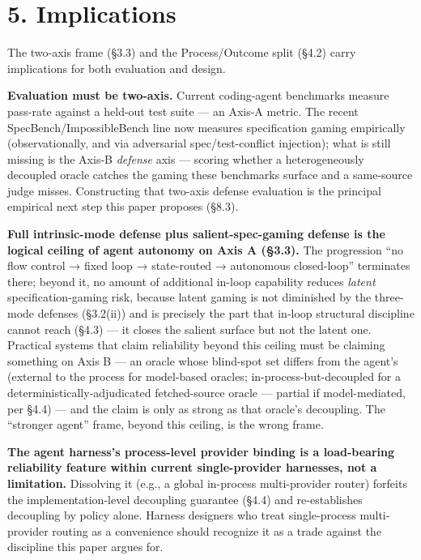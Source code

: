 \documentclass[
  11pt,
]{article}
\begin{document}
\section{5. Implications}\label{implications}

The two-axis frame (§3.3) and the Process/Outcome split (§4.2) carry
implications for both evaluation and design.

\textbf{Evaluation must be two-axis.} Current coding-agent benchmarks
measure pass-rate against a held-out test suite --- an Axis-A metric.
The recent SpecBench/ImpossibleBench line now measures specification
gaming empirically (observationally, and via adversarial
spec/test-conflict injection); what is still missing is the Axis-B
\emph{defense} axis --- scoring whether a heterogeneously decoupled
oracle catches the gaming these benchmarks surface and a same-source
judge misses. Constructing that two-axis defense evaluation is the
principal empirical next step this paper proposes (§8.3).

\textbf{Full intrinsic-mode defense plus salient-spec-gaming defense is
the logical ceiling of agent autonomy on Axis A (§3.3).} The progression
``no flow control → fixed loop → state-routed → autonomous closed-loop''
terminates there; beyond it, no amount of additional in-loop capability
reduces \emph{latent} specification-gaming risk, because latent gaming
is not diminished by the three-mode defenses (§3.2(ii)) and is precisely
the part that in-loop structural discipline cannot reach (§4.3) --- it
closes the salient surface but not the latent one. Practical systems
that claim reliability beyond this ceiling must be claiming something on
Axis B --- an oracle whose blind-spot set differs from the agent's
(external to the process for model-based oracles;
in-process-but-decoupled for a deterministically-adjudicated
fetched-source oracle --- partial if model-mediated, per §4.4) --- and
the claim is only as strong as that oracle's decoupling. The ``stronger
agent'' frame, beyond this ceiling, is the wrong frame.

\textbf{The agent harness's process-level provider binding is a
load-bearing reliability feature within current single-provider
harnesses, not a limitation.} Dissolving it (e.g., a global in-process
multi-provider router) forfeits the implementation-level decoupling
guarantee (§4.4) and re-establishes decoupling by policy alone. Harness
designers who treat single-process multi-provider routing as a
convenience should recognize it as a trade against the discipline this
paper argues for.
\end{document}
